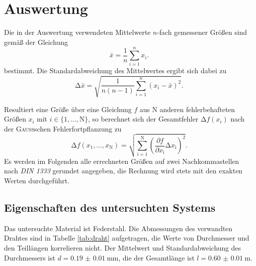 \section{Auswertung}
\label{sec:Auswertung}
Die in der Auswertung verwendeten Mittelwerte $n$-fach gemessener Größen sind gemäß der Gleichung
\begin{equation}
    \bar{x}=\frac{1}{n}\sum_{i=1}^n x_i.
    \label{eq:mittelwert}
\end{equation}
bestimmt. 
Die Standardabweichung des Mittelwertes ergibt sich dabei zu
\begin{equation}
    \mathup{\Delta}\bar{x}=\sqrt{\frac{1}{n(n-1)}\sum_{i=1}^n\left(x_i-\bar{x}\right)^2}.
    \label{eq:standardabweichung}
\end{equation}

Resultiert eine Größe über eine Gleichung $f$ aus N anderen fehlerbehafteten Größen $x_i$ mit $i\in\{1,…,\text{N}\}$, so
berechnet sich der Gesamtfehler $\mathup{\Delta}f(x_i)$ nach der \textsc{Gauß}schen Fehlerfortpflanzung zu
\begin{equation}
	\mathup{\Delta}f(x_1,...,x_\text{N})=\sqrt{\sum_{\text{i}=1}^\text{N}\left(\frac{\partial f}{\partial x_\text{i}}\mathup{\Delta}x_\text{i}\right)^2}.
	\label{eq:gauss_gen}
\end{equation}
Es werden im Folgenden alle errechneten Größen auf zwei Nachkommastellen nach \textit{DIN 1333} gerundet angegeben, 
die Rechnung wird stets mit den exakten Werten durchgeführt.
\subsection{Eigenschaften des untersuchten Systems}
\label{sec:auswertung1}
Das untersuchte Material ist Federstahl.
Die Abmessungen des verwandten Drahtes sind in Tabelle \ref{tab:draht} aufgetragen, die Werte von Durchmesser und den Teillängen korrelieren nicht.
Der Mittelwert und Standardabweichung des Durchmessers ist $d=\SI{0.19(1)}{\milli\meter}$, die der Gesamtlänge ist $l=\SI{0.60(1)}{\meter}$.

